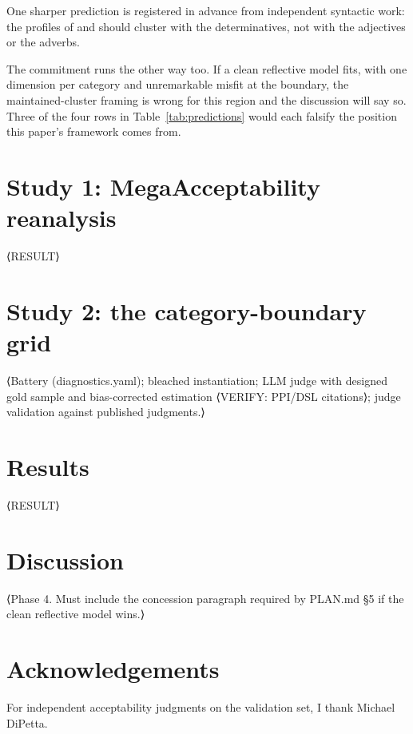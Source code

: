 \documentclass[12pt]{article}
\begin{document}
One sharper prediction is registered in advance from independent syntactic
work: the profiles of  and  should cluster with the
determinatives, not with the adjectives or the adverbs.

The commitment runs the other way too. If a clean reflective model fits, with one
dimension per category and unremarkable misfit at the boundary, the
maintained-cluster framing is wrong for this region and the discussion will say
so. Three of the four rows in Table~\ref{tab:predictions} would each falsify the
position this paper's framework comes from.

\section{Study 1: MegaAcceptability reanalysis}\label{sec:study1}
⟨RESULT⟩

\section{Study 2: the category-boundary grid}\label{sec:methods}
⟨Battery (diagnostics.yaml); bleached instantiation; LLM judge with
designed gold sample and bias-corrected estimation ⟨VERIFY: PPI/DSL
citations⟩; judge validation against published judgments.⟩

\section{Results}\label{sec:results}
⟨RESULT⟩

\section{Discussion}\label{sec:discussion}
⟨Phase 4. Must include the concession paragraph required by PLAN.md
\S5 if the clean reflective model wins.⟩

\section*{Acknowledgements}
For independent acceptability judgments on the validation set, I thank
Michael DiPetta.

\clearpage
\printbibliography
\end{document}
